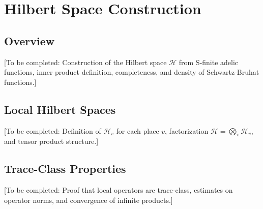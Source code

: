 \section{Hilbert Space Construction}

\subsection{Overview}

[To be completed: Construction of the Hilbert space $\mathcal{H}$ from S-finite adelic functions, inner product definition, completeness, and density of Schwartz-Bruhat functions.]

\subsection{Local Hilbert Spaces}

[To be completed: Definition of $\mathcal{H}_v$ for each place $v$, factorization $\mathcal{H} = \bigotimes_v \mathcal{H}_v$, and tensor product structure.]

\subsection{Trace-Class Properties}

[To be completed: Proof that local operators are trace-class, estimates on operator norms, and convergence of infinite products.]

